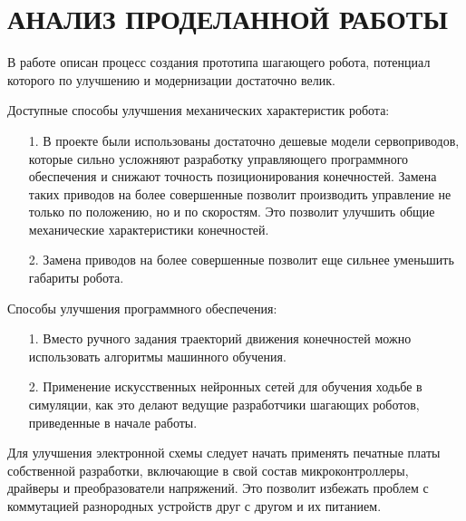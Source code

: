 \chapter{\MakeUppercase{Анализ проделанной работы}}

В работе описан процесс создания прототипа шагающего робота, потенциал которого по улучшению и модернизации достаточно велик.

Доступные способы улучшения механических характеристик робота:
\begin{itemize}
    \item[1.] В проекте были использованы достаточно дешевые модели сервоприводов, которые сильно усложняют разработку управляющего программного обеспечения и снижают точность позиционирования конечностей. Замена таких приводов на более совершенные позволит производить управление не только по положению, но и по скоростям. Это позволит улучшить общие механические характеристики конечностей.
    \item[2.] Замена приводов на более совершенные позволит еще сильнее уменьшить габариты робота. 
\end{itemize}

Способы улучшения программного обеспечения:
\begin{itemize}
    \item[1.] Вместо ручного задания траекторий движения конечностей можно использовать алгоритмы машинного обучения.
    \item[2.] Применение искусственных нейронных сетей для обучения ходьбе в симуляции, как это делают ведущие разработчики шагающих роботов, приведенные в начале работы. 
\end{itemize}

Для улучшения электронной схемы следует начать применять печатные платы собственной разработки, включающие в свой состав микроконтроллеры, драйверы и преобразователи напряжений. Это позволит избежать проблем с коммутацией разнородных устройств друг с другом и их питанием.